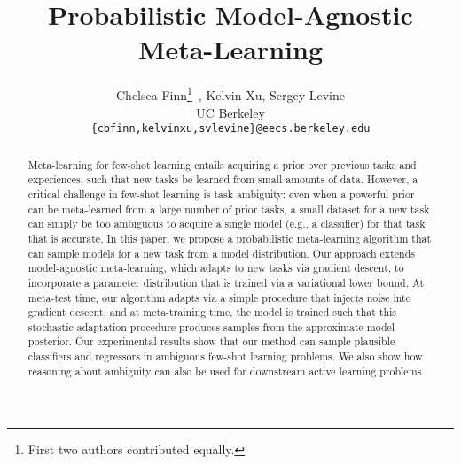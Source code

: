 \documentclass{article}
\title{Probabilistic Model-Agnostic Meta-Learning}
\author{
  Chelsea Finn\thanks{First two authors contributed equally.}~, Kelvin Xu\!, Sergey Levine \\
  UC Berkeley\\
  \texttt{\{cbfinn,kelvinxu,svlevine\}@eecs.berkeley.edu} \\
}
\begin{document}
\maketitle

\begin{abstract}
Meta-learning for few-shot learning entails acquiring a prior over previous tasks and experiences, such that new tasks be learned from small amounts of data. However, a critical challenge in few-shot learning is task ambiguity: even when a powerful prior can be meta-learned from a large number of prior tasks, a small dataset for a new task can simply be too ambiguous to acquire a single model (e.g., a classifier) for that task that is accurate. In this paper, we propose a probabilistic meta-learning algorithm that can sample models for a new task from a model distribution. Our approach extends model-agnostic meta-learning, which adapts to new tasks via gradient descent, to incorporate a parameter distribution that is trained via a variational lower bound. At meta-test time, our algorithm adapts via a simple procedure that injects noise into gradient descent, and at meta-training time, the model is trained such that this stochastic adaptation procedure produces samples from the approximate model posterior. Our experimental results show that our method can sample plausible classifiers and regressors in ambiguous few-shot learning problems. We also show how reasoning about ambiguity can also be used for downstream active learning problems.
\end{abstract}

\newcommand{\cmt}[1]{{\footnotesize\textcolor{red}{#1}}}
\newcommand{\note}[1]{\cmt{Note: #1}}
\newcommand{\todo}[1]{\cmt{TO-DO: #1}}
\newcommand{\sergey}[1]{\cmt{Sergey: #1}}
\newcommand{\chelsea}[1]{\cmt{Chelsea: #1}}
\newcommand{\kelvin}[1]{\cmt{Kelvin: #1}}
\newcommand{\review}[1]{\noindent\textcolor{red}{ #1}}
\newcommand{\response}[1]{\noindent{#1}}

\newcommand{\diff}[1]{\textcolor{red}{#1}}

\long{}

\newcommand{\data}{\mathcal{D}}
\newcommand{\task}{\mathcal{T}}

\newcommand{\etal}{{et~al.}\ }
\newcommand{\eg}{e.g.\ }
\newcommand{\ie}{i.e.\ }
\newcommand{\nth}{\text{th}}
\newcommand{\pr}{^\prime}
\newcommand{\tr}{^\mathrm{T}}
\newcommand{\inv}{^{-1}}
\newcommand{\pinv}{^{\dagger}}
\newcommand{\real}{\mathbb{R}}
\newcommand{\gauss}{\mathcal{N}}
\newcommand{\norm}[1]{\left|#1\right|}
\newcommand{\trace}{\text{tr}}
\newcommand{\expectation}[2]{\mathbb{E}_{#1}\left[ #2 \right]}
\end{document}
